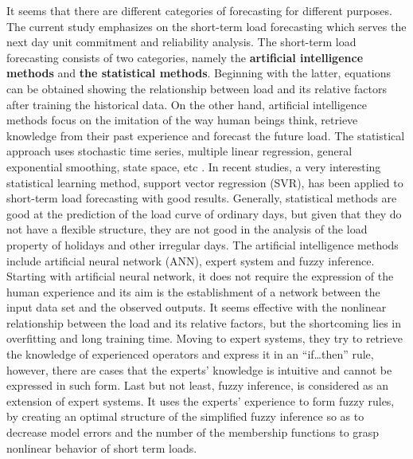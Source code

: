 \par It seems that there are different categories of forecasting for different purposes. The current study emphasizes on the short-term load forecasting which serves the next day unit commitment and reliability analysis. The short-term load forecasting consists of two categories, namely the \textbf{artificial intelligence methods} and \textbf{the statistical methods}. Beginning with the latter, equations can be obtained showing the relationship between load and its relative factors after training the historical data. On the other hand, artificial intelligence methods focus on the imitation of the way human beings think, retrieve knowledge from their past experience and forecast the future load. The statistical approach uses stochastic time series, multiple linear regression, general exponential smoothing, state space, etc \cite{adhikari2013introductory}. In recent studies, a very interesting statistical learning method, support vector regression (SVR), has been applied to short-term load forecasting with good results. Generally, statistical methods are good at the prediction of the load curve of ordinary days, but given that they do not have a flexible structure, they are not good in the analysis of the load property of holidays and other irregular days.  The artificial intelligence methods include artificial neural network (ANN), expert system and fuzzy inference. Starting with artificial neural network, it does not require the expression of the human experience and its aim is the establishment of a network between the input data set and the observed outputs. It seems effective with the nonlinear relationship between the load and its relative factors, but the shortcoming lies in overfitting and long training time. Moving to expert systems, they try to retrieve the knowledge of experienced operators and express it in an “if…then” rule, however, there are cases that the experts’ knowledge is intuitive and cannot be expressed in such form. Last but not least, fuzzy inference, is considered as an extension of expert systems. It uses the experts’ experience to form fuzzy rules, by creating an optimal structure of the simplified fuzzy inference so as to decrease model errors and the number of the membership functions to grasp nonlinear behavior of short term loads. 
